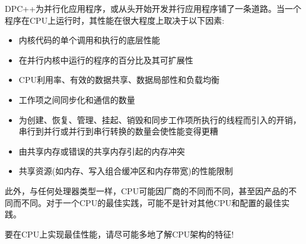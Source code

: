 DPC++为并行化应用程序，或从头开始开发并行应用程序铺了一条道路。当一个程序在CPU上运行时，其性能在很大程度上取决于以下因素:\par

\begin{itemize}
	\item 内核代码的单个调用和执行的底层性能
	\item 在并行内核中运行的程序的百分比及其可扩展性
	\item CPU利用率、有效的数据共享、数据局部性和负载均衡
	\item 工作项之间同步化和通信的数量
	\item 为创建、恢复、管理、挂起、销毁和同步工作项所执行的线程而引入的开销，串行到并行或并行到串行转换的数量会使性能变得更糟
	\item 由共享内存或错误的共享内存引起的内存冲突
	\item 共享资源(如内存、写入组合缓冲区和内存带宽)的性能限制
\end{itemize}

此外，与任何处理器类型一样，CPU可能因厂商的不同而不同，甚至因产品的不同而不同。对于一个CPU的最佳实践，可能不是针对其他CPU和配置的最佳实践。\par

\begin{tcolorbox}[colback=red!5!white,colframe=red!75!black]
要在CPU上实现最佳性能，请尽可能多地了解CPU架构的特征!
\end{tcolorbox}











